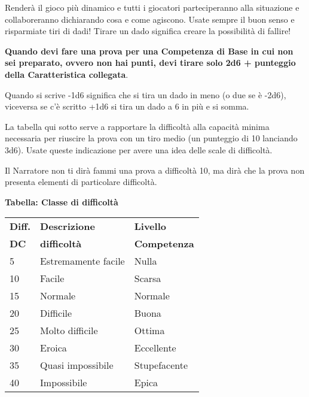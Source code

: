 \begin{multicols}{2}
\begin{changemargin}{0.3cm}{0.3cm}
\begin{narratore}
Renderà il gioco più dinamico e tutti i giocatori parteciperanno alla situazione e collaboreranno dichiarando cosa e come agiscono. Usate sempre il buon senso e risparmiate tiri di dadi! Tirare un dado significa creare la possibilità di fallire!
\end{narratore}\end{changemargin}



%

\medskip

\textbf{Quando devi fare una prova per una Competenza di Base in cui non sei preparato, ovvero non hai punti, devi tirare solo 2d6 + punteggio della Caratteristica collegata}.

Quando si scrive -1d6 significa che si tira un dado in meno (o due se è -2d6), viceversa se c'è scritto +1d6 si tira un dado a 6 in più e si somma.

La tabella qui sotto serve a rapportare la difficoltà alla capacità minima necessaria per riuscire la prova con un tiro medio (un punteggio di 10 lanciando 3d6). Usate queste indicazione per avere una idea delle scale di difficoltà.

Il Narratore non ti dirà fammi una prova a difficoltà 10, ma dirà che la prova non presenta elementi di particolare difficoltà.

%

\medskip

\textbf{Tabella: Classe di difficoltà}\label{basedifficolta}

\medskip

\begin{tabularx}{0.45\textwidth}{lll}
\textbf{Diff.} & \textbf{Descrizione} & \textbf{Livello}\\
\textbf{DC}&\textbf{difficoltà}& \textbf{Competenza}\\
\toprule
5 & Estremamente facile & Nulla\\
10 & Facile & Scarsa\\
15 & Normale & Normale\\
20 & Difficile & Buona\\
25 & Molto difficile & Ottima\\
30 & Eroica& Eccellente\\
35 & Quasi impossibile & Stupefacente\\
40 & Impossibile & Epica
\end{tabularx}


\end{multicols}
